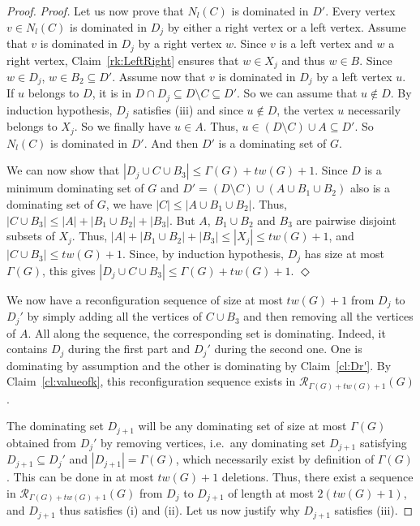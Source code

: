 \documentclass[10pt]{article}
\newenvironment{proofclaim}[1][]%
    {\noindent \emph{Proof.} {}{#1}{}}{\hfill
    $\Diamond$\vspace{1em}}
\begin{document}
\begin{proof}
\begin{proofclaim}
Let us now prove that $N_l(C)$ is dominated in $D'$. Every vertex $v\in N_l(C)$ is dominated in $D_j$ by either a right vertex or a left vertex. Assume that $v$ is dominated in $D_j$ by a right vertex $w$. Since $v$ is a left vertex and $w$ a right vertex, Claim~\ref{rk:LeftRight} ensures that $w \in X_j$ and thus $w \in B$. Since $w \in D_j$, $w \in B_2\subseteq D'$. 
Assume now that $v$ is dominated in $D_j$ by a left vertex $u$. If $u$ belongs to $D$, it is in $D\cap D_j\subseteq D\setminus C \subseteq D'$. So we can assume that $u \notin D$. By induction hypothesis, $D_j$ satisfies (iii) and since $u \notin D$, the vertex $u$ necessarily belongs to $X_j$. So we finally have $u \in A$. Thus, $u \in  (D\setminus C)\cup A\subseteq D'$. So $N_l(C)$ is dominated in $D'$. And then $D'$ is a dominating set of $G$.

We can now show that $|D_j\cup C \cup B_3|\leq \Gamma(G)+tw(G)+1$. Since $D$ is a minimum dominating set of $G$ and $D'=(D\setminus C)\cup (A\cup B_1\cup B_2)$ also is a dominating set of $G$, we have $|C|\leq |A\cup B_1\cup B_2|$. Thus, $|C \cup B_3|\leq |A|+|B_1\cup B_2|+|B_3|$. But $A$, $B_1\cup B_2$ and $B_3$ are pairwise disjoint subsets of $X_j$. Thus, $|A|+|B_1\cup B_2|+|B_3|\leq |X_j| \leq tw(G)+1$, and $|C \cup B_3|\leq tw(G)+1$. Since, by induction hypothesis, $D_j$ has size at most $\Gamma(G)$, this gives $|D_j\cup C \cup B_3|\leq \Gamma(G)+tw(G)+1$.
\end{proofclaim}

We now have a reconfiguration sequence of size at most $tw(G)+1$ from $D_j$ to $D_j'$ by simply adding all the vertices of $C \cup B_3$ and then removing all the vertices of $A$. All along the sequence, the corresponding set is dominating. Indeed, it contains $D_j$ during the first part and $D_j'$ during the second one. One is dominating by assumption and the other is dominating by Claim~\ref{cl:Dr'}. By Claim~\ref{cl:valueofk}, this reconfiguration sequence exists in $\mathcal{R}_{\Gamma(G)+tw(G)+1}(G)$.

The dominating set $D_{j+1}$ will be any dominating set of size at most $\Gamma(G)$ obtained from $D_j'$ by removing vertices, i.e.\ any dominating set $D_{j+1}$ satisfying $D_{j+1} \subseteq D_j'$ and $|D_{j+1}|=\Gamma(G)$, which necessarily exist by definition of $\Gamma(G)$.
This can be done in at most $tw(G)+1$ deletions. Thus, there exist a sequence in $\mathcal{R}_{\Gamma(G)+tw(G)+1}(G)$ from $D_j$ to $D_{j+1}$ of length at most $2(tw(G)+1)$, and $D_{j+1}$ thus satisfies (i) and (ii). Let us now justify why $D_{j+1}$ satisfies (iii).


\end{proof}
\end{document}
